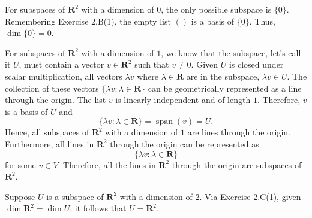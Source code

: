 \documentclass{article}
\begin{document}
For subspaces of $\mathbf{R}^2$ with a dimension of $0$, the only possible subspace is $\{0\}$. 
Remembering Exercise 2.B(1), the empty list $()$ is a basis of $\{0\}$. 
Thus, $\operatorname{dim}\{0\}=0$.

For subspaces of $\mathbf{R}^2$ with a dimension of $1$, we know that the subspace, let's call it $U$, must contain a vector $v\in\mathbf{R}^2$ such that $v\neq0$. 
Given $U$ is closed under scalar multiplication, all vectors $\lambda v$ where $\lambda\in\mathbf{R}$ are in the subspace, $\lambda v\in U$. 
The collection of these vectors $\{\lambda v:\lambda\in\mathbf{R}\}$ can be geometrically represented as a line through the origin. 
The list $v$ is linearly independent and of length $1$. 
Therefore, $v$ is a basis of $U$ and
\[\{\lambda v:\lambda\in\mathbf{R}\}=\operatorname{span}(v)=U.\]
Hence, all subspaces of $\mathbf{R}^2$ with a dimension of $1$ are lines through the origin. 
Furthermore, all lines in $\mathbf{R}^2$ through the origin can be represented as 
\[\{\lambda v:\lambda\in\mathbf{R}\}\]
for some $v\in V$. 
Therefore, all the lines in $\mathbf{R}^2$ through the origin are subspaces of $\mathbf{R}^2$.

Suppose $U$ is a subspace of $\mathbf{R}^2$ with a dimension of $2$. 
Via Exercise 2.C(1), given $\operatorname{dim}\mathbf{R}^2=\operatorname{dim}U$, it follows that $U=\mathbf{R}^2$.
\end{document}
